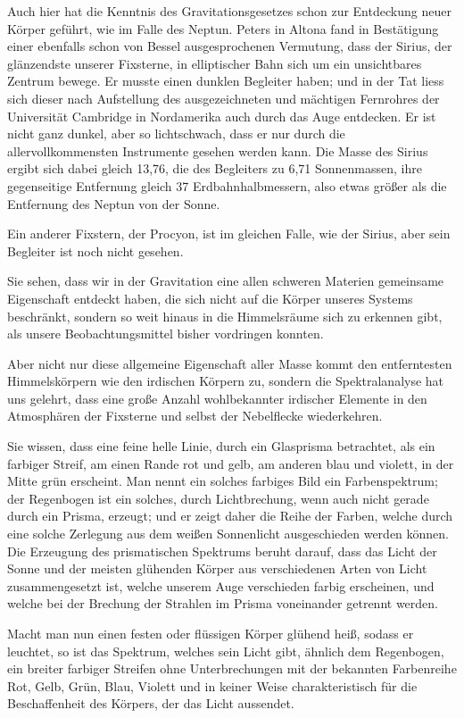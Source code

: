 \documentclass[a4paper, 11pt, oneside, german]{article}
\begin{document}
Auch hier hat die Kenntnis des Gravitationsgesetzes schon zur Entdeckung neuer Körper geführt, wie im Falle des Neptun. Peters in Altona fand in Bestätigung einer ebenfalls schon von Bessel ausgesprochenen Vermutung, dass der Sirius, der glänzendste unserer Fixsterne, in elliptischer Bahn sich um ein unsichtbares Zentrum bewege. Er musste einen dunklen Begleiter haben; und in der Tat liess sich dieser nach Aufstellung des ausgezeichneten und mächtigen Fernrohres der Universität Cambridge in Nordamerika auch durch das Auge entdecken. Er ist nicht ganz dunkel, aber so lichtschwach, dass er nur durch die allervollkommensten Instrumente gesehen werden kann. Die Masse des Sirius ergibt sich dabei gleich 13,76, die des Begleiters zu 6,71 Sonnenmassen, ihre gegenseitige Entfernung gleich 37 Erdbahnhalbmessern, also etwas größer als die Entfernung des Neptun von der Sonne.

Ein anderer Fixstern, der Procyon, ist im gleichen Falle, wie der Sirius, aber sein Begleiter ist noch nicht gesehen.

Sie sehen, dass wir in der Gravitation eine allen schweren Materien gemeinsame Eigenschaft entdeckt haben, die sich nicht auf die Körper unseres Systems beschränkt, sondern so weit hinaus in die Himmelsräume sich zu erkennen gibt, als unsere Beobachtungsmittel bisher vordringen konnten.

Aber nicht nur diese allgemeine Eigenschaft aller Masse kommt den entferntesten Himmelskörpern wie den irdischen Körpern zu, sondern die Spektralanalyse hat uns gelehrt, dass eine große Anzahl wohlbekannter irdischer Elemente in den Atmosphären der Fixsterne und selbst der Nebelflecke wiederkehren.

Sie wissen, dass eine feine helle Linie, durch ein Glasprisma betrachtet, als ein farbiger Streif, am einen Rande rot und gelb, am anderen blau und violett, in der Mitte grün erscheint. Man nennt ein solches farbiges Bild ein Farbenspektrum; der Regenbogen ist ein solches, durch Lichtbrechung, wenn auch nicht gerade durch ein Prisma, erzeugt; und er zeigt daher die Reihe der Farben, welche durch eine solche Zerlegung aus dem weißen Sonnenlicht ausgeschieden werden können. Die Erzeugung des prismatischen Spektrums beruht darauf, dass das Licht der Sonne und der meisten glühenden Körper aus verschiedenen Arten von Licht zusammengesetzt ist, welche unserem Auge verschieden farbig erscheinen, und welche bei der Brechung der Strahlen im Prisma voneinander getrennt werden.

Macht man nun einen festen oder flüssigen Körper glühend heiß, sodass er leuchtet, so ist das Spektrum, welches sein Licht gibt, ähnlich dem Regenbogen, ein breiter farbiger Streifen ohne Unterbrechungen mit der bekannten Farbenreihe Rot, Gelb, Grün, Blau, Violett und in keiner Weise charakteristisch für die Beschaffenheit des Körpers, der das Licht aussendet.
\end{document}
